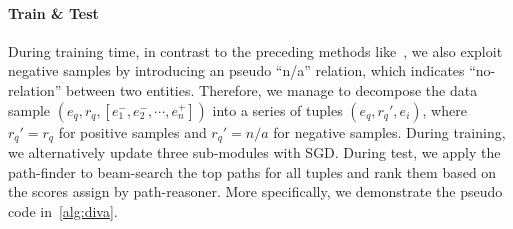\documentclass[11pt,a4paper]{article}
\makeatletter
\def\BState{\State\hskip-\ALG@thistlm}
\makeatother
\begin{document}
\begin{algorithm}[t]
\caption{The \textsc{Diva} Algorithm.}\label{alg:diva}
\end{algorithm}
\paragraph{Train \& Test} During training time, in contrast to the preceding methods like~, we also exploit negative samples by introducing an pseudo ``n/a'' relation, which indicates ``no-relation'' between two entities. Therefore, we manage to decompose the data sample $(e_q, r_q, [e_1^-, e_2^-, \cdots, e_n^+])$ into a series of tuples $(e_q, r_q', e_i)$, where $r_q'=r_q$ for positive samples and $r_q'=n/a$ for negative samples. During training, we alternatively update three sub-modules with SGD. During test, we apply the path-finder to beam-search the top paths for all tuples and rank them based on the scores assign by path-reasoner. More specifically, we demonstrate the pseudo code in~\autoref{alg:diva}.
\end{document}
